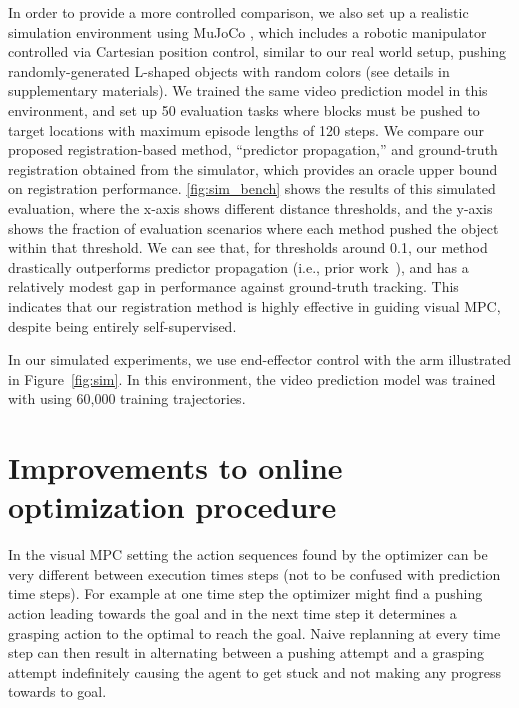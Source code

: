 In order to provide a more controlled comparison, we also set up a realistic simulation environment using MuJoCo \cite{todorov2012mujoco}, which includes a robotic manipulator controlled via Cartesian position control, similar to our real world setup, pushing randomly-generated L-shaped objects with random colors (see details in supplementary materials). 
We trained the same video prediction model in this environment, and set up 50 evaluation tasks where blocks must be pushed to target locations with maximum episode lengths of 120 steps. 
We  compare our proposed registration-based method, ``predictor propagation,'' and ground-truth registration obtained from the simulator, which provides an oracle upper bound on registration performance. \autoref{fig:sim_bench} shows the results of this simulated evaluation, where the x-axis shows different distance thresholds, and the y-axis shows the fraction of evaluation scenarios where each method pushed the object within that threshold. We can see that, for thresholds around 0.1, our method drastically outperforms predictor propagation (i.e., prior work~\cite{sna}), and has a relatively modest gap in performance against ground-truth tracking. This indicates that our registration method is highly effective in guiding visual MPC, despite being entirely self-supervised.



In our simulated experiments, we use end-effector control with the arm illustrated in Figure~\ref{fig:sim}. In this environment, the video prediction model was trained with using 60,000 training trajectories.


\section{Improvements to online optimization procedure}
In the visual MPC setting the action sequences found by the optimizer can be very different between execution times steps (not to be confused with prediction time steps). For example at one time step the optimizer might find a pushing action leading towards the goal and in the next time step it determines a grasping action to the optimal to reach the goal. Naive replanning at every time step can then result in alternating between a pushing attempt and a grasping attempt indefinitely causing the agent to get stuck and not making any progress towards to goal. 

